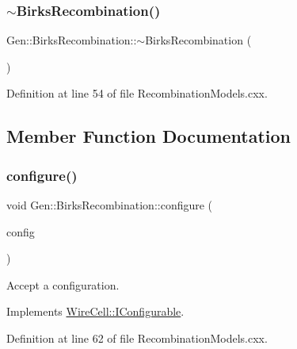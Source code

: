 \subsubsection{\texorpdfstring{$\sim$\+Birks\+Recombination()}{~BirksRecombination()}}
{\footnotesize\ttfamily Gen\+::\+Birks\+Recombination\+::$\sim$\+Birks\+Recombination (\begin{DoxyParamCaption}{ }\end{DoxyParamCaption})\hspace{0.3cm}{\ttfamily [virtual]}}



Definition at line 54 of file Recombination\+Models.\+cxx.



\subsection{Member Function Documentation}
\mbox{\label{class_wire_cell_1_1_gen_1_1_birks_recombination_ad31fca3728b8815405db0f1ddb7d25ac}} 
\subsubsection{\texorpdfstring{configure()}{configure()}}
{\footnotesize\ttfamily void Gen\+::\+Birks\+Recombination\+::configure (\begin{DoxyParamCaption}\item[{const \hyperlink{namespace_wire_cell_a9f705541fc1d46c608b3d32c182333ee}{Wire\+Cell\+::\+Configuration} \&}]{config }\end{DoxyParamCaption})\hspace{0.3cm}{\ttfamily [virtual]}}



Accept a configuration. 



Implements \hyperlink{class_wire_cell_1_1_i_configurable_a57ff687923a724093df3de59c6ff237d}{Wire\+Cell\+::\+I\+Configurable}.



Definition at line 62 of file Recombination\+Models.\+cxx.

\mbox{\label{class_wire_cell_1_1_gen_1_1_birks_recombination_a8b05816264eceae54a5d56a9bee504ea}} 
